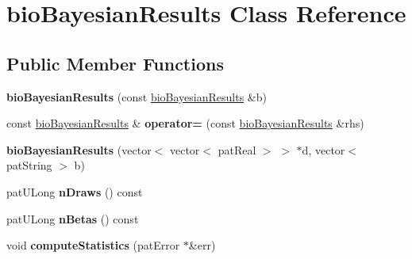 \hypertarget{classbio_bayesian_results}{}\section{bio\+Bayesian\+Results Class Reference}
\label{classbio_bayesian_results}
\subsection*{Public Member Functions}
\begin{DoxyCompactItemize}
\item 
\mbox{\label{classbio_bayesian_results_a16d7407b817dbc17683c684583196bb1}} 
{\bfseries bio\+Bayesian\+Results} (const \hyperlink{classbio_bayesian_results}{bio\+Bayesian\+Results} \&b)
\item 
\mbox{\label{classbio_bayesian_results_a00f0500762569648e3a627712dbf01c9}} 
const \hyperlink{classbio_bayesian_results}{bio\+Bayesian\+Results} \& {\bfseries operator=} (const \hyperlink{classbio_bayesian_results}{bio\+Bayesian\+Results} \&rhs)
\item 
\mbox{\label{classbio_bayesian_results_add8dceb0501882df28de4361d0c94089}} 
{\bfseries bio\+Bayesian\+Results} (vector$<$ vector$<$ pat\+Real $>$ $>$ $\ast$d, vector$<$ pat\+String $>$ b)
\item 
\mbox{\label{classbio_bayesian_results_a08964ab3bd01010db8750bd8da318b8e}} 
pat\+U\+Long {\bfseries n\+Draws} () const
\item 
\mbox{\label{classbio_bayesian_results_a86055db87cf2f5f40ce67251cb3747b9}} 
pat\+U\+Long {\bfseries n\+Betas} () const
\item 
\mbox{\label{classbio_bayesian_results_a49d16d2d3ae4979ff81b3ff0e7f10e4f}} 
void {\bfseries compute\+Statistics} (pat\+Error $\ast$\&err)
\end{DoxyCompactItemize}
